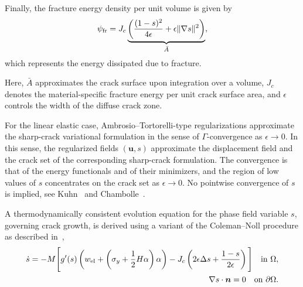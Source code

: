 \documentclass[pdflatex,sn-mathphys-num]{sn-jnl}%
\theoremstyle{thmstyleone}%
\theoremstyle{thmstyletwo}%
\theoremstyle{thmstylethree}%
\begin{document}
Finally, the fracture energy density per unit volume is given by
\begin{equation}
    \psi_{\rm{fr}} = J_c
    \underbrace{\left(
    \dfrac{(1-s)^2}{4\epsilon} + \epsilon\|\nabla{s}\|^2
    \right)}_{\bar{A}},
    \label{eq:psi_fr}
\end{equation}
which represents the energy dissipated due to fracture. 

Here, $\bar{A}$ approximates the crack surface upon integration over a volume, $J_c$ denotes the material-specific fracture energy per unit crack surface area, and $\epsilon$ controls the width of the diffuse crack zone.


For the linear elastic case, Ambrosio--Tortorelli-type regularizations approximate the sharp-crack variational formulation in the sense of $\Gamma$-convergence as $\epsilon \to 0$. In this sense, the regularized fields $(\boldsymbol{u},s)$ approximate the displacement field and the crack set of the corresponding sharp-crack formulation. The convergence is that of the energy functionals and of their minimizers, and the region of low values of $s$ concentrates on the crack set as $\epsilon \to 0$. No pointwise convergence of $s$ is implied, see Kuhn~\cite{kuhn_numerical_2013} and Chambolle~\cite{chambolle_approximation_2004}.

A thermodynamically consistent evolution equation for the phase field variable $s$, governing crack growth, is derived using a variant of the Coleman--Noll procedure as described in~\cite{noll_3d_2020},
\begin{align}
    \begin{split}
    \dot{s} = -M \Bigg[
    g'(s)\left(w_{\rm{el}} + \left(\sigma_y+\dfrac{1}{2}H\alpha\right)\alpha\right)
    - J_c\left(2\epsilon\Delta{s} + \dfrac{1-s}{2\epsilon}\right)
    \Bigg]
    \quad \text{in} \ \Omega, \\
    \nabla{s}\cdot{\boldsymbol{n}} = 0 \quad \text{on} \ \partial\Omega.
    \label{eq:evolution_s}
    \end{split}
\end{align}
\end{document}
